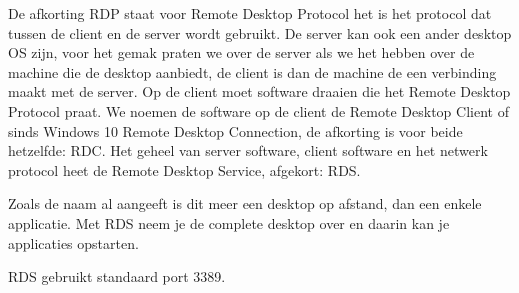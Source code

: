 De afkorting RDP staat voor Remote Desktop Protocol het is het protocol dat tussen de client en de server wordt gebruikt. De server kan ook een ander desktop OS zijn, voor het gemak praten we over de server als we het hebben over de machine die de desktop aanbiedt, de client is dan de machine de een verbinding maakt met de server. Op de client moet software draaien die het Remote Desktop Protocol praat. We noemen de software op de client de Remote Desktop Client of sinds Windows 10 Remote Desktop Connection, de afkorting is voor beide hetzelfde: RDC. Het geheel van server software, client software en het netwerk protocol heet de Remote Desktop Service, afgekort: RDS.

Zoals de naam al aangeeft is dit meer een desktop op afstand, dan een enkele applicatie. Met RDS neem je de complete desktop over en daarin kan je applicaties opstarten.

RDS gebruikt standaard port 3389.
